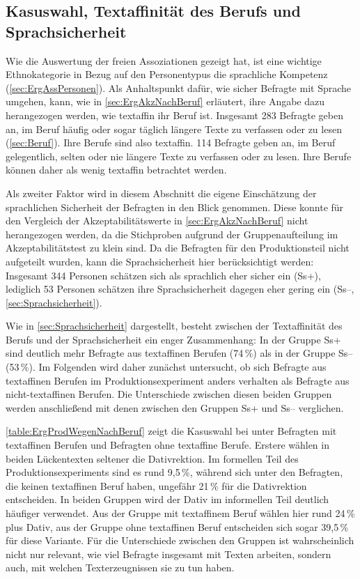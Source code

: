 \subsection{Kasuswahl, Textaffinität des Berufs und Sprachsicherheit}
\label{sec:ErgProdNachSk}
Wie die Auswertung der freien Assoziationen gezeigt hat, ist eine wichtige Ethnokategorie in Bezug auf den Personentypus die sprachliche Kompetenz (\autoref{sec:ErgAssPersonen}). 
Als Anhaltspunkt dafür, wie sicher Befragte mit Sprache umgehen, kann, wie in \autoref{sec:ErgAkzNachBeruf} erläutert, ihre Angabe dazu herangezogen werden, wie textaffin ihr Beruf ist. 
Insgesamt 283 Befragte geben an, im Beruf häufig oder sogar täglich längere Texte zu verfassen oder zu lesen (\autoref{sec:Beruf}). 
Ihre Berufe sind also textaffin. 
114 Befragte geben an, im Beruf gelegentlich, selten oder nie längere Texte zu verfassen oder zu lesen. 
Ihre Berufe können daher als wenig textaffin betrachtet werden. 

\begin{sloppypar}
Als zweiter Faktor wird in diesem Abschnitt die eigene Einschätzung der sprachlichen Sicherheit der Befragten in den Blick genommen. 
Diese konnte für den Vergleich der Akzeptabilitätswerte in \autoref{sec:ErgAkzNachBeruf} nicht herangezogen werden, da die Stichproben aufgrund der Gruppenaufteilung im Akzeptabilitätstest zu klein sind.
Da die Befragten für den Produktionsteil nicht aufgeteilt wurden, kann die Sprachsicherheit hier berücksichtigt werden:
Insgesamt 344 Personen schätzen sich als sprachlich eher sicher ein (Ss+), lediglich 53 Personen schätzen ihre Sprachsicherheit dagegen eher gering ein (Ss--, \autoref{sec:Sprachsicherheit}). 
\end{sloppypar}

Wie in \autoref{sec:Sprachsicherheit} dargestellt, besteht zwischen der Textaffinität des Berufs und der Sprachsicherheit ein enger Zusammenhang: 
In der Gruppe Ss+ sind deutlich mehr Befragte aus textaffinen Berufen (74\,\%) als in der Gruppe Ss-- (53\,\%).  
Im Folgenden wird daher zunächst untersucht, ob sich Befragte aus textaffinen Berufen im Produktionsexperiment anders verhalten als Befragte aus nicht\hyp textaffinen Berufen. 
Die Unterschiede zwischen diesen beiden Gruppen werden anschließend mit denen zwischen den Gruppen Ss+ und Ss-- verglichen. 

\autoref{table:ErgProdWegenNachBeruf} zeigt die Kasuswahl bei \wegen{} unter Befragten mit textaffinen Berufen und Befragten ohne textaffine Berufe.  
Erstere wählen in beiden Lückentexten seltener die Dativrektion. 
Im formellen Teil des Produktionsexperiments sind es rund 9,5\,\%, während sich unter den Befragten, die keinen textaffinen Beruf haben, ungefähr 21\,\% für die Dativrektion entscheiden.
In beiden Gruppen wird der Dativ im informellen Teil deutlich häufiger verwendet. 
Aus der Gruppe mit textaffinem Beruf wählen hier rund 24\,\% \wegen{} plus Dativ, aus der Gruppe ohne textaffinen Beruf entscheiden sich sogar 39,5\,\% für diese Variante. 
Für die Unterschiede zwischen den Gruppen ist wahrscheinlich nicht nur relevant, wie viel Befragte insgesamt mit Texten arbeiten, sondern auch, mit welchen Text\-erzeug\-nis\-sen sie zu tun haben. 

